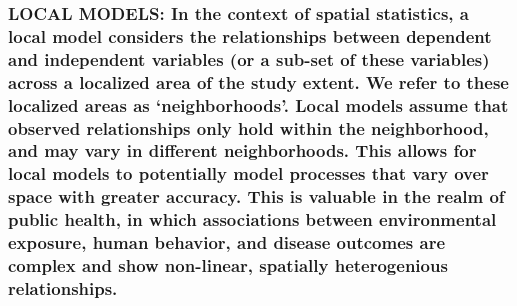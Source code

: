 \documentclass[
  12pt,
]{article}
\begin{document}
\hypertarget{local-models-in-the-context-of-spatial-statistics-a-local-model-considers-the-relationships-between-dependent-and-independent-variables-or-a-sub-set-of-these-variables-across-a-localized-area-of-the-study-extent.-we-refer-to-these-localized-areas-as-neighborhoods.-local-models-assume-that-observed-relationships-only-hold-within-the-neighborhood-and-may-vary-in-different-neighborhoods.-this-allows-for-local-models-to-potentially-model-processes-that-vary-over-space-with-greater-accuracy.-this-is-valuable-in-the-realm-of-public-health-in-which-associations-between-environmental-exposure-human-behavior-and-disease-outcomes-are-complex-and-show-non-linear-spatially-heterogenious-relationships.}{%
\subsubsection{LOCAL MODELS: In the context of spatial statistics, a
local model considers the relationships between dependent and
independent variables (or a sub-set of these variables) across a
localized area of the study extent. We refer to these localized areas as
`neighborhoods'. Local models assume that observed relationships only
hold within the neighborhood, and may vary in different neighborhoods.
This allows for local models to potentially model processes that vary
over space with greater accuracy. This is valuable in the realm of
public health, in which associations between environmental exposure,
human behavior, and disease outcomes are complex and show non-linear,
spatially heterogenious
relationships.}\label{local-models-in-the-context-of-spatial-statistics-a-local-model-considers-the-relationships-between-dependent-and-independent-variables-or-a-sub-set-of-these-variables-across-a-localized-area-of-the-study-extent.-we-refer-to-these-localized-areas-as-neighborhoods.-local-models-assume-that-observed-relationships-only-hold-within-the-neighborhood-and-may-vary-in-different-neighborhoods.-this-allows-for-local-models-to-potentially-model-processes-that-vary-over-space-with-greater-accuracy.-this-is-valuable-in-the-realm-of-public-health-in-which-associations-between-environmental-exposure-human-behavior-and-disease-outcomes-are-complex-and-show-non-linear-spatially-heterogenious-relationships.}}
\end{document}

